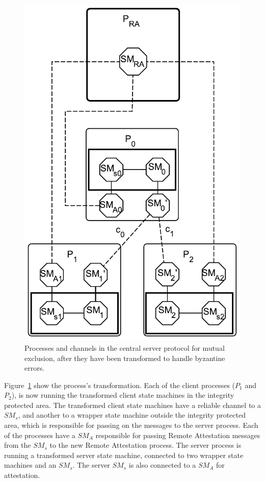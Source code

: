 \documentclass{article}
\begin{document}
		\begin{figure}[ht]
			\center
			\includegraphics[scale=0.6]{figures/state-machines/CSME-protocol-transformed.pdf}
			\caption{Processes and channels in the central server protocol for mutual exclusion, after they have been transformed to handle byzantine errors.}
			\label{fig:CSME-protocol-transformed}
		\end{figure}
		\FloatBarrier

		Figure~\ref{fig:CSME-protocol-transformed} show the process's transformation.
		Each of the client processes ($P_1$ and $P_2$), is now running the transformed client state machines in the integrity protected area.
		The transformed client state machines have a reliable channel to a $SM_s$, and another to a wrapper state machine outside the integrity protected area, which is responsible for passing on the messages to the server process.
		Each of the processes have a $SM_A$ responsible for passing Remote Attestation messages from the $SM_s$ to the new Remote Attestation process.
		The server process is running a transformed server state machine, connected to two wrapper state machines and an $SM_s$.
		The server $SM_s$ is also connected to a $SM_A$ for attestation.
\end{document}
